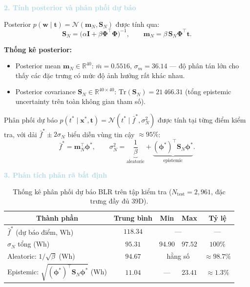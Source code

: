 \noindent\textcolor{lightblue}{\textbf{2. Tính posterior và phân phối dự báo}}

Posterior $p(\boldsymbol{w} \mid \boldsymbol{t}) = \mathcal{N}(\mathbf{m}_N, \mathbf{S}_N)$
được tính qua:
$$
  \mathbf{S}_N = \bigl(\alpha\mathbf{I} + \beta\boldsymbol{\Phi}^\top\boldsymbol{\Phi}\bigr)^{-1},
  \qquad
  \mathbf{m}_N = \beta\,\mathbf{S}_N\boldsymbol{\Phi}^\top\boldsymbol{t}.
$$

\textbf{Thống kê posterior:}
\begin{itemize}[labelsep=10pt, leftmargin=2cm]
  \item Posterior mean $\mathbf{m}_N \in \mathbb{R}^{40}$: 
        $\bar{m} = 0.5516$, $\sigma_m = 36.14$ --- độ phân tán lớn cho thấy
        các đặc trưng có mức độ ảnh hưởng rất khác nhau.
  \item Posterior covariance $\mathbf{S}_N \in \mathbb{R}^{40\times40}$:
        $\mathrm{Tr}(\mathbf{S}_N) = 21\,466.31$ (tổng epistemic uncertainty
        trên toàn không gian tham số).
\end{itemize}

Phân phối dự báo $p(t^* \mid \boldsymbol{x}^*, \boldsymbol{t})
= \mathcal{N}(t^* \mid \bar{f}^*, \sigma_N^2)$ được tính tại từng điểm kiểm tra,
với dải $\bar{f}^* \pm 2\sigma_N$ biểu diễn vùng tin cậy $\approx 95\%$:
$$
  \bar{f}^* = \mathbf{m}_N^\top\boldsymbol{\phi}^*, \qquad
  \sigma_N^2 = \underbrace{\frac{1}{\beta}}_{\text{aleatoric}}
             + \underbrace{(\boldsymbol{\phi}^*)^\top\mathbf{S}_N\boldsymbol{\phi}^*}_{\text{epistemic}}.
$$

\noindent\textcolor{lightblue}{\textbf{3. Phân tích phân rã bất định}}


\begin{table}[H]
\centering
\caption{Thống kê phân phối dự báo BLR trên tập kiểm tra
         ($N_\text{test} = 2{,}961$, đặc trưng đầy đủ 39D).}
\label{tab:blr_predictive}
\renewcommand{\arraystretch}{1.3}
\begin{tabular}{|l|c|c|c|c|}
    \hline
    \multicolumn{1}{|c|}{\textbf{Thành phần}} &
    \multicolumn{1}{c|}{\textbf{Trung bình}} &
    \multicolumn{1}{c|}{\textbf{Min}} &
    \multicolumn{1}{c|}{\textbf{Max}} &
    \multicolumn{1}{c|}{\textbf{Tỷ lệ}} \\
    \hline
    $\bar{f}^*$ (dự báo điểm, Wh)
        & $118.34$ & \multicolumn{2}{c|}{---} & --- \\
    \hline
    $\sigma_N$ tổng (Wh)
        & $95.31$  & $94.90$ & $97.52$ & $100\%$ \\
    \hline
    \quad Aleatoric: $1/\sqrt{\beta}$ (Wh)
        & $94.67$  & \multicolumn{2}{c|}{hằng số} & $\approx 98.7\%$ \\
    \hline
    \quad Epistemic: $\sqrt{(\boldsymbol{\phi}^*)^\top\mathbf{S}_N\boldsymbol{\phi}^*}$ (Wh)
        & $11.04$  & --- & $23.41$ & $\approx 1.3\%$ \\
    \hline
\end{tabular}
\end{table}


